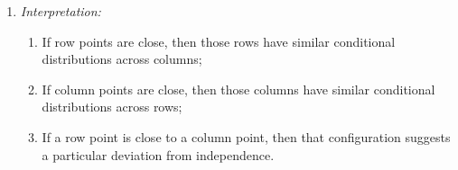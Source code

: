 \documentclass[12pt]{article}
\begin{document}
\begin{enumerate}[label=\textbf{\arabic*.}]
\begin{enumerate}
		\item \textit{Interpretation:} 
		\begin{enumerate}
			\item If row points are close, then those rows have similar conditional distributions across columns; 
			\item If column points are close, then those columns have similar conditional distributions across rows; 
			\item If a row point is close to a column point, then that configuration suggests a particular deviation from independence. 
		\end{enumerate}
	\end{enumerate}
	
\end{enumerate}


%
%
%	
%	
\end{document}
